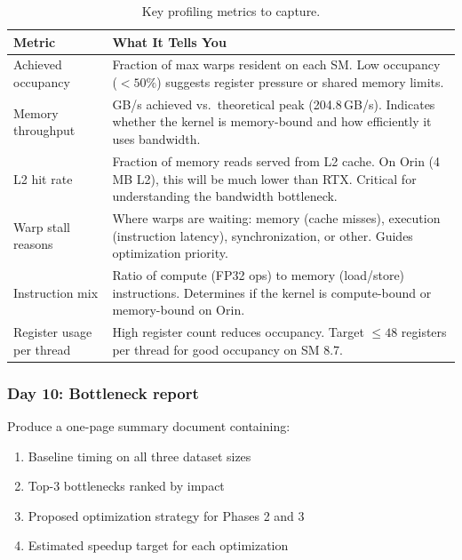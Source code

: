 \documentclass[11pt,letterpaper]{article}
\begin{document}
\begin{table}[h]
\centering
\caption{Key profiling metrics to capture.}
\label{tab:profile_metrics}
\begin{tabular}{@{}p{4.5cm}p{8.5cm}@{}}
\toprule
\textbf{Metric} & \textbf{What It Tells You} \\
\midrule
Achieved occupancy &
    Fraction of max warps resident on each SM. Low occupancy ($<50\%$)
    suggests register pressure or shared memory limits. \\
\addlinespace
Memory throughput &
    GB/s achieved vs.\ theoretical peak (204.8\,GB/s). Indicates whether
    the kernel is memory-bound and how efficiently it uses bandwidth. \\
\addlinespace
L2 hit rate &
    Fraction of memory reads served from L2 cache. On Orin (4\,MB L2),
    this will be much lower than RTX. Critical for understanding the
    bandwidth bottleneck. \\
\addlinespace
Warp stall reasons &
    Where warps are waiting: memory (cache misses), execution
    (instruction latency), synchronization, or other. Guides optimization
    priority. \\
\addlinespace
Instruction mix &
    Ratio of compute (FP32 ops) to memory (load/store) instructions.
    Determines if the kernel is compute-bound or memory-bound on Orin. \\
\addlinespace
Register usage per thread &
    High register count reduces occupancy. Target $\leq 48$ registers
    per thread for good occupancy on SM 8.7. \\
\bottomrule
\end{tabular}
\end{table}

\subsubsection{Day 10: Bottleneck report}

Produce a one-page summary document containing:
\begin{enumerate}[leftmargin=2em]
    \item Baseline timing on all three dataset sizes
    \item Top-3 bottlenecks ranked by impact
    \item Proposed optimization strategy for Phases 2 and 3
    \item Estimated speedup target for each optimization
\end{enumerate}
\end{document}
